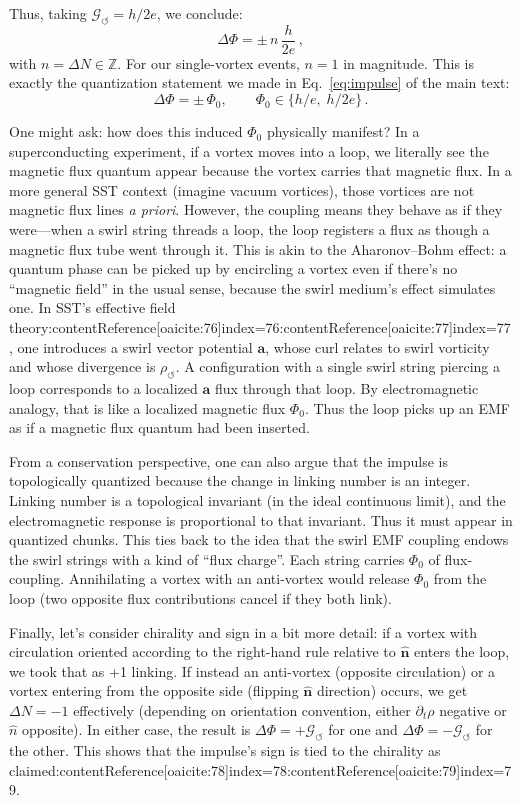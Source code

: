 \documentclass[12pt]{article}
\begin{document}
{Thus, taking $\mathcal{G}_{\!\boldsymbol{\circlearrowleft}} = h/2e$, we conclude:
\[
\Delta\Phi = \pm\,n\,\frac{h}{2e}\,,
\]
with $n = \Delta N \in \mathbb{Z}$. For our single-vortex events, $n=1$ in magnitude. This is exactly the quantization statement we made in Eq.~\eqref{eq:impulse} of the main text:
\[
\Delta\Phi = \pm\,\Phi_{0}, \qquad \Phi_{0}\in\{h/e,\;h/2e\}\,.
\]

One might ask: how does this induced $\Phi_{0}$ physically manifest? In a superconducting experiment, if a vortex moves into a loop, we literally see the magnetic flux quantum appear because the vortex carries that magnetic flux. In a more general SST context (imagine vacuum vortices), those vortices are not magnetic flux lines \emph{a priori}. However, the coupling means they behave as if they were—when a swirl string threads a loop, the loop registers a flux as though a magnetic flux tube went through it. This is akin to the Aharonov–Bohm effect: a quantum phase can be picked up by encircling a vortex even if there's no ``magnetic field'' in the usual sense, because the swirl medium's effect simulates one. In SST’s effective field theory:contentReference[oaicite:76]{index=76}:contentReference[oaicite:77]{index=77}, one introduces a swirl vector potential $\mathbf{a}$, whose curl relates to swirl vorticity and whose divergence is $\rho_{\!\boldsymbol{\circlearrowleft}}$. A configuration with a single swirl string piercing a loop corresponds to a localized $\mathbf{a}$ flux through that loop. By electromagnetic analogy, that is like a localized magnetic flux $\Phi_{0}$. Thus the loop picks up an EMF as if a magnetic flux quantum had been inserted.

From a conservation perspective, one can also argue that the impulse is topologically quantized because the change in linking number is an integer. Linking number is a topological invariant (in the ideal continuous limit), and the electromagnetic response is proportional to that invariant. Thus it must appear in quantized chunks. This ties back to the idea that the swirl EMF coupling endows the swirl strings with a kind of ``flux charge''. Each string carries $\Phi_{0}$ of flux-coupling. Annihilating a vortex with an anti-vortex would release $\Phi_{0}$ from the loop (two opposite flux contributions cancel if they both link).

Finally, let's consider chirality and sign in a bit more detail: if a vortex with circulation oriented according to the right-hand rule relative to $\hat{\mathbf{n}}$ enters the loop, we took that as +1 linking. If instead an anti-vortex (opposite circulation) or a vortex entering from the opposite side (flipping $\hat{\mathbf{n}}$ direction) occurs, we get $\Delta N = -1$ effectively (depending on orientation convention, either $\partial_t \rho$ negative or $\hat{n}$ opposite). In either case, the result is $\Delta\Phi = +\mathcal{G}_{\!\boldsymbol{\circlearrowleft}}$ for one and $\Delta\Phi = -\mathcal{G}_{\!\boldsymbol{\circlearrowleft}}$ for the other. This shows that the impulse’s sign is tied to the chirality as claimed:contentReference[oaicite:78]{index=78}:contentReference[oaicite:79]{index=79}.

}
\end{document}
